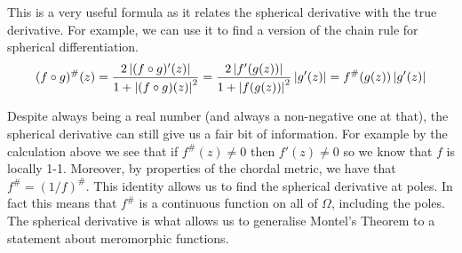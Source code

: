 This is a very useful formula as it relates the spherical derivative with the true derivative. For example, we can use it to find a version of the chain rule for spherical differentiation.
\begin{align*}
    (f \circ g)^\#(z) = \frac{2 \left|(f \circ g)'(z)\right|}{1 + \left|(f \circ g)(z)\right|^2} = \frac{2 \left|f'(g(z))\right|}{1 + \left|f(g(z))\right|^2} \left|g'(z)\right| = f^\#(g(z)) \left|g'(z)\right|
\end{align*}

Despite always being a real number (and always a non-negative one at that), the spherical derivative can still give us a fair bit of information. For example by the calculation above we see that if $f^\#(z) \neq 0$ then $f'(z) \neq 0$ so we know that $f$ is locally 1-1. Moreover, by properties of the chordal metric, we have that $f^\# = (1/f)^\#$. This identity allows us to find the spherical derivative at poles. In fact this means that $f^\#$ is a continuous function on all of $\Omega$, including the poles. The spherical derivative is what allows us to generalise Montel's Theorem to a statement about meromorphic functions.

